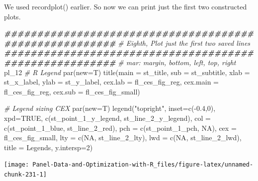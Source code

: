 \documentclass[
]{book}
\newenvironment{Shaded}{\begin{snugshade}}{\end{snugshade}}
\newcommand{\AttributeTok}[1]{\textcolor[rgb]{0.77,0.63,0.00}{#1}}
\newcommand{\CommentTok}[1]{\textcolor[rgb]{0.56,0.35,0.01}{\textit{#1}}}
\newcommand{\ConstantTok}[1]{\textcolor[rgb]{0.00,0.00,0.00}{#1}}
\newcommand{\DecValTok}[1]{\textcolor[rgb]{0.00,0.00,0.81}{#1}}
\newcommand{\DocumentationTok}[1]{\textcolor[rgb]{0.56,0.35,0.01}{\textbf{\textit{#1}}}}
\newcommand{\FloatTok}[1]{\textcolor[rgb]{0.00,0.00,0.81}{#1}}
\newcommand{\FunctionTok}[1]{\textcolor[rgb]{0.00,0.00,0.00}{#1}}
\newcommand{\NormalTok}[1]{#1}
\newcommand{\SpecialCharTok}[1]{\textcolor[rgb]{0.00,0.00,0.00}{#1}}
\newcommand{\StringTok}[1]{\textcolor[rgb]{0.31,0.60,0.02}{#1}}
\begin{document}
We used recordplot() earlier. So now we can print just the first two constructed plots.

\begin{Shaded}
\begin{Highlighting}[]
\DocumentationTok{\#\#\#\#\#\#\#\#\#\#\#\#\#\#\#\#\#\#\#\#\#\#\#\#\#\#\#\#\#\#\#\#\#\#\#\#\#\#\#\#\#\#\#\#\#\#\#\#\#\#\#\#\#\#\#}
\CommentTok{\# Eighth, Plot just the first two saved lines}
\DocumentationTok{\#\#\#\#\#\#\#\#\#\#\#\#\#\#\#\#\#\#\#\#\#\#\#\#\#\#\#\#\#\#\#\#\#\#\#\#\#\#\#\#\#\#\#\#\#\#\#\#\#\#\#\#\#\#\#}
\CommentTok{\# mar: margin, bottom, left, top, right}
\NormalTok{pl\_12}
\CommentTok{\# R Legend}
\FunctionTok{par}\NormalTok{(}\AttributeTok{new=}\NormalTok{T)}
\FunctionTok{title}\NormalTok{(}\AttributeTok{main =}\NormalTok{ st\_title, }\AttributeTok{sub =}\NormalTok{ st\_subtitle, }\AttributeTok{xlab =}\NormalTok{ st\_x\_label, }\AttributeTok{ylab =}\NormalTok{ st\_y\_label,}
      \AttributeTok{cex.lab =}\NormalTok{ fl\_ces\_fig\_reg,}
      \AttributeTok{cex.main =}\NormalTok{ fl\_ces\_fig\_reg,}
      \AttributeTok{cex.sub =}\NormalTok{ fl\_ces\_fig\_small)}

\CommentTok{\# Legend sizing CEX}
\FunctionTok{par}\NormalTok{(}\AttributeTok{new=}\NormalTok{T)}
\FunctionTok{legend}\NormalTok{(}\StringTok{"topright"}\NormalTok{,}
       \AttributeTok{inset=}\FunctionTok{c}\NormalTok{(}\SpecialCharTok{{-}}\FloatTok{0.4}\NormalTok{,}\DecValTok{0}\NormalTok{),}
       \AttributeTok{xpd=}\ConstantTok{TRUE}\NormalTok{,}
       \FunctionTok{c}\NormalTok{(st\_point\_1\_y\_legend, st\_line\_2\_y\_legend),}
       \AttributeTok{col =} \FunctionTok{c}\NormalTok{(st\_point\_1\_blue, st\_line\_2\_red),}
       \AttributeTok{pch =} \FunctionTok{c}\NormalTok{(st\_point\_1\_pch, }\ConstantTok{NA}\NormalTok{),}
       \AttributeTok{cex =}\NormalTok{ fl\_ces\_fig\_small,}
       \AttributeTok{lty =} \FunctionTok{c}\NormalTok{(}\ConstantTok{NA}\NormalTok{, st\_line\_2\_lty),}
       \AttributeTok{lwd =} \FunctionTok{c}\NormalTok{(}\ConstantTok{NA}\NormalTok{, st\_line\_2\_lwd),}
       \AttributeTok{title =} \StringTok{\textquotesingle{}Legends\textquotesingle{}}\NormalTok{,}
       \AttributeTok{y.intersp=}\DecValTok{2}\NormalTok{)}
\end{Highlighting}
\end{Shaded}

\begin{center}\texttt{[image: Panel-Data-and-Optimization-with-R\_files/figure-latex/unnamed-chunk-231-1]} \end{center}
\end{document}
